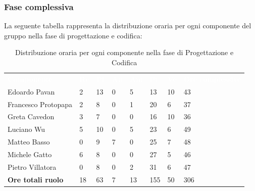 \subsubsection{Fase complessiva}
La seguente tabella rappresenta la distribuzione oraria per ogni componente del gruppo nella fase di progettazione e codifica:
\begin{table}[H]
\begin{center}
\renewcommand{\arraystretch}{1.25}
\begin{tabular}{ m{}<{\centering}  m{}<{\centering} m{}<{\centering} m{}<{\centering}  m{}<{\centering}  m{}<{\centering}  m{}<{\centering}  m{}<{\centering}   }
	\rowcolor{darkblue}
	\textcolor{white}{\textbf{Componente}} &\textcolor{white}{\textbf{Re}}&\textcolor{white}{\textbf{Pt}}&\textcolor{white}{\textbf{An}}&\textcolor{white}{\textbf{Am}}&\textcolor{white}{\textbf{Pr}}&\textcolor{white}{\textbf{Ve}}&\textcolor{white}{\textbf{Ore complessive}}\\ 
	Edoardo Pavan & 2 & 13 & 0 & 5 & 13 & 10 & 43 \\	
	
	Francesco Protopapa & 2 & 8 & 0 & 1 & 20 & 6 & 37 \\

	Greta Cavedon & 3 & 7 & 0 & 0 & 16 & 10 & 36 \\
	
	Luciano Wu & 5 & 10 & 0 & 5 & 23 & 6 & 49 \\
	
	Matteo Basso & 0 & 9 & 7 & 0 & 25 & 7 & 48 \\
	
	Michele Gatto & 6 & 8 & 0 & 0 & 27 & 5 & 46 \\
	
	Pietro Villatora & 0 & 8 & 0 & 2 & 31 & 6 & 47 \\
	
	\textbf{Ore totali ruolo} & 18 & 63 & 7 & 13 & 155 & 50 & 306\\

\end{tabular}
\caption{Distribuzione oraria per ogni componente nella fase di Progettazione e Codifica}
\end{center}
\end{table}

